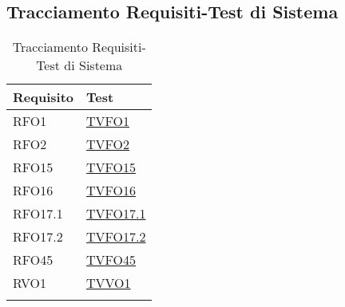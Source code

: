 \subsection{Tracciamento Requisiti-Test di Sistema}
\normalsize
\begin{longtable}{|>{\centering}m{5cm}|m{5cm}<{\centering}|}
\hline
\textbf{Requisito} & \textbf{Test}\\
\hline
\endhead
RFO1 & \hyperlink{TVFO1}{TVFO1}\\ \hline
RFO2 & \hyperlink{TVFO2}{TVFO2}\\ \hline
RFO15 & \hyperlink{TVFO15}{TVFO15}\\ \hline
RFO16 & \hyperlink{TVFO16}{TVFO16}\\ \hline
RFO17.1 & \hyperlink{TVFO17.1}{TVFO17.1}\\ \hline
RFO17.2 & \hyperlink{TVFO17.2}{TVFO17.2}\\ \hline
RFO45 & \hyperlink{TVFO45}{TVFO45}\\ \hline
RVO1 & \hyperlink{TVVO1}{TVVO1}\\ \hline
\caption[Tracciamento Requisiti-Test di Sistema]{Tracciamento Requisiti-Test di Sistema}
\label{tabella:requi-tv}
\end{longtable}
\clearpage



